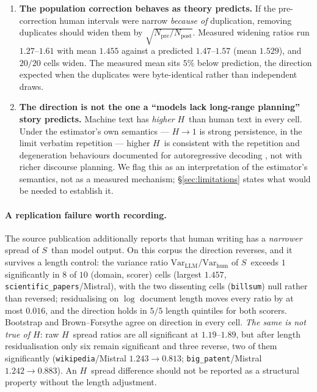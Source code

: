 \documentclass{article}
\newcommand{\Strue}{\ensuremath{S}}
\newcommand{\Htrue}{\ensuremath{H}}
\begin{document}
\begin{enumerate}
\item \textbf{The population correction behaves as theory predicts.} If the
  pre-correction human intervals were narrow \emph{because of} duplication,
  removing duplicates should widen them by
  $\sqrt{N_{\text{pre}}/N_{\text{post}}}$. Measured widening
  ratios run $1.27$--$1.61$ with mean $1.455$ against a predicted $1.47$--$1.57$
  (mean $1.529$), and $20/20$ cells widen. The measured mean sits $5\%$ below
  prediction, the direction expected when the duplicates were byte-identical
  rather than independent draws.
\item \textbf{The direction is not the one a ``models lack long-range
  planning'' story predicts.} Machine text has \emph{higher} \Htrue\ than human
  text in every cell. Under the estimator's own semantics --- $\Htrue\to1$ is
  strong persistence, in the limit verbatim repetition --- higher \Htrue\ is
  consistent with the repetition and degeneration behaviours documented for
  autoregressive decoding \citep{holtzman2020curious,du2025correlation}, not
  with richer discourse planning. We flag this as an interpretation of the
  estimator's semantics, not as a measured mechanism; \S\ref{sec:limitations}
  states what would be needed to establish it.
\end{enumerate}

\paragraph{A replication failure worth recording.}
The source publication additionally reports that human writing has a
\emph{narrower} spread of \Strue\ than model output. On this corpus the
direction reverses, and it survives a length control:
the variance ratio $\mathrm{Var}_{\text{LLM}}/\mathrm{Var}_{\text{hum}}$ of
\Strue\ exceeds $1$ significantly in $8$ of $10$ (domain, scorer) cells (largest
$1.457$, \texttt{scientific\_papers}/Mistral), with the two dissenting cells
(\texttt{billsum}) null rather than reversed; residualising on $\log$ document
length moves every ratio by at most $0.016$, and the direction holds in $5/5$
length quintiles for both scorers. Bootstrap and Brown--Forsythe agree on
direction in every cell. \emph{The same is not true of \Htrue}: raw \Htrue\
spread ratios are all significant at $1.19$--$1.89$, but after length
residualisation only six remain significant and three reverse, two of them
significantly (\texttt{wikipedia}/Mistral $1.243\!\to\!0.813$;
\texttt{big\_patent}/Mistral $1.242\!\to\!0.883$). An \Htrue\ spread difference
should not be reported as a structural property without the length adjustment.
\end{document}
